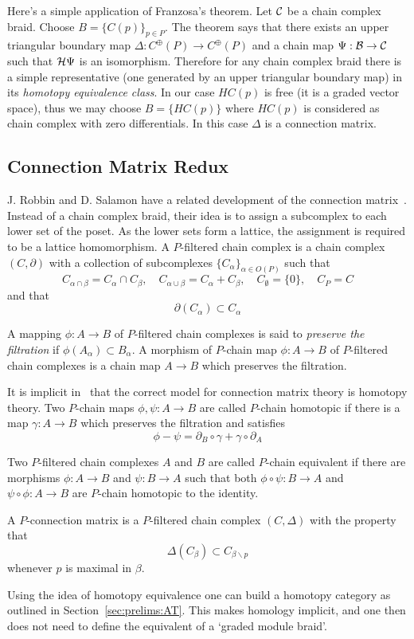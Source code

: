 Here's a simple application of Franzosa's theorem.  Let ${\mathcal C}$ be a chain complex braid.  Choose $B = \{C(p)\}_{p\in P}$.  The theorem says that there exists an upper triangular boundary map $\Delta:C^\oplus(P)\to C^\oplus(P)$ and a chain map $\Psi:{\mathcal B}\to {\mathcal C}$ such that ${\mathcal H}\Psi$ is an isomorphism.  Therefore for any chain complex braid there is a simple representative (one generated by an upper triangular boundary map) in its {\em homotopy equivalence class}.  In our case $HC(p)$ is free (it is a graded vector space), thus we may choose $B=\{HC(p)\}$ where $HC(p)$ is considered as chain complex with zero differentials.  In this case $\Delta$ is a connection matrix.


\subsection{Connection Matrix Redux}



J. Robbin and D. Salamon have a related development of the connection matrix~\cite{salamon}.   Instead of a chain complex braid, their idea is to assign a subcomplex to each lower set of the poset.  As the lower sets form a lattice, the assignment is required to be a lattice homomorphism.  A $P$-filtered chain complex is a chain complex $(C,\partial)$ with a collection of subcomplexes $\{C_\alpha\}_{\alpha\in O(P)}$ such that $$C_{\alpha\cap \beta} = C_\alpha\cap C_\beta, \quad C_{\alpha\cup \beta} = C_\alpha + C_\beta,\quad C_\emptyset = \{0\},\quad C_P = C$$ and that $$\partial(C_\alpha)\subset C_\alpha$$

A mapping $\phi:A\to B$ of $P$-filtered chain complexes is said to {\em preserve the filtration} if $\phi(A_\alpha)\subset B_\alpha$.  A morphism of $P$-chain map $\phi:A\to B$ of $P$-filtered chain complexes is a chain map $A\to B$ which preserves the filtration.

It is implicit in~\cite{salamon} that the correct model for connection matrix theory is homotopy theory.    Two $P$-chain maps $\phi,\psi:A\to B$ are called $P$-chain homotopic if there is a map $\gamma:A\to B$ which preserves the filtration and satisfies $$\phi-\psi = \partial_B \circ \gamma + \gamma\circ \partial_A$$

Two $P$-filtered chain complexes $A$ and $B$ are called $P$-chain equivalent if there are morphisms $\phi:A\to B$ and $\psi:B\to A$ such that both $\phi\circ \psi:B\to A$ and $\psi\circ \phi:A\to B$ are $P$-chain homotopic to the identity.  

A $P$-connection matrix is a $P$-filtered chain complex $(C,\Delta)$ with the property that $$\Delta(C_\beta)\subset C_{\beta \backslash p}$$ whenever $p$ is maximal in $\beta$.  

Using the idea of homotopy equivalence one can build a homotopy category as outlined in Section~\ref{sec:prelims:AT}.  This makes homology implicit, and one then does not need to define the equivalent of a `graded module braid'.  

